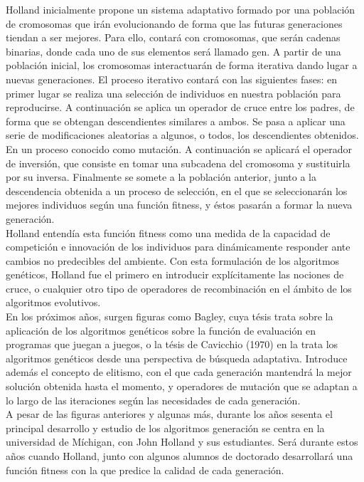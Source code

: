 \documentclass[12pt]{article} \usepackage[utf8x]{inputenc}
\begin{document}
Holland inicialmente propone un sistema adaptativo formado por una población 
de cromosomas que irán evolucionando de forma que las futuras generaciones 
tiendan a ser mejores. Para ello, contará con cromosomas, que serán cadenas 
binarias, donde cada uno de sus elementos será llamado gen. A partir de una 
población inicial, los cromosomas interactuarán de forma iterativa dando lugar 
a nuevas generaciones. El proceso iterativo contará con las siguientes fases: 
en primer lugar se realiza una selección de individuos en nuestra población 
para reproducirse. A continuación se aplica un operador de cruce entre los 
padres, de forma que se obtengan descendientes similares a ambos. Se pasa a 
aplicar una serie de modificaciones aleatorias a algunos, o todos, los descendientes 
obtenidos. En un proceso conocido como mutación. A continuación se aplicará 
el operador de inversión, que consiste en tomar una subcadena del cromosoma 
y sustituirla por su inversa. Finalmente se somete a la población anterior, 
junto a la descendencia obtenida a un proceso de selección, en el que se 
seleccionarán los mejores individuos según una función fitness, y éstos pasarán 
a formar la nueva generación.\\

Holland entendía esta función fitness como una medida de la capacidad de 
competición e innovación de los individuos para dinámicamente responder 
ante cambios no predecibles del ambiente. Con esta formulación de los 
algoritmos genéticos, Holland fue el primero en introducir explícitamente 
las nociones de cruce, o cualquier otro tipo de operadores de recombinación 
en el ámbito de los algoritmos evolutivos.\\

En los próximos años, surgen figuras como Bagley, cuya tésis trata sobre la 
aplicación de los algoritmos genéticos sobre la función de evaluación en 
programas que juegan a juegos, o la tésis de Cavicchio (1970) en la trata 
los algoritmos genéticos desde una perspectiva de búsqueda adaptativa. 
Introduce además el concepto de elitismo, con el que cada generación mantendrá 
la mejor solución obtenida hasta el momento, y operadores de mutación que se 
adaptan a lo largo de las iteraciones según las necesidades de cada generación.\\

A pesar de las figuras anteriores y algunas más, durante los años sesenta el 
principal desarrollo y estudio de los algoritmos generación se centra en la 
universidad de Míchigan, con John Holland y sus estudiantes. Será durante estos 
años cuando Holland, junto con algunos alumnos de doctorado desarrollará una 
función fitness con la que predice la calidad de cada generación.\\
\end{document}

